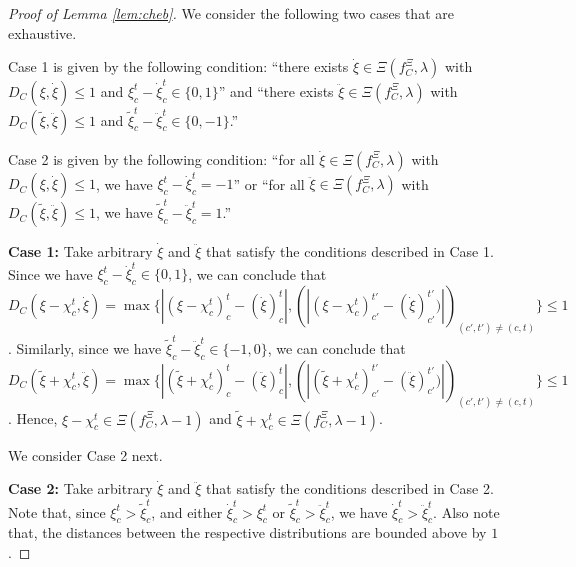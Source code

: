 \documentclass[12pt]{amsart}
\theoremstyle{remark}
\newcommand{\ieh}[1]{{\color{orange} IEH: #1 }}
\newcommand{\fk}[1]{{\color{red} FK: #1 }}
\begin{document}
\begin{proof}[Proof of Lemma \ref{lem:cheb}]
We consider the following two cases that are exhaustive.

Case 1 is given by the following condition: ``there exists $\dot{\xi} \in \Xi(f_C^{\Xi},\lambda)$ with $D_C(\xi,\dot{\xi}) \leq 1$ and $\xi_c^t - \dot{\xi}_c^t \in \{0,1\}$'' and ``there exists $\ddot{\xi} \in \Xi(f_C^{\Xi},\lambda)$ with $D_C(\tilde{\xi},\ddot{\xi}) \leq 1$ and $\tilde{\xi}_c^t - \ddot{\xi}_c^t \in \{0,-1\}$.''

Case 2 is given by the following condition: ``for all $\dot{\xi} \in \Xi(f_C^{\Xi},\lambda)$ with $D_C(\xi,\dot{\xi}) \leq 1$, we have $\xi_c^t - \dot{\xi}_c^t = -1$'' or ``for all $\ddot{\xi} \in \Xi(f_C^{\Xi},\lambda)$ with $D_C(\tilde{\xi},\ddot{\xi}) \leq 1$, we have $\tilde{\xi}_c^t - \ddot{\xi}_c^t = 1$.''


\medskip
\textbf{Case 1:} Take arbitrary $\dot{\xi}$ and $\ddot{\xi}$ that satisfy the conditions described in Case 1. Since we have $\xi_c^t - \dot{\xi}_c^t \in \{0, 1\}$, we can conclude that $D_C(\xi-\chi_c^t,\dot{\xi})=\max\{|(\xi-\chi_c^t)^t_c-(\dot{\xi})^t_c|, (|(\xi-\chi_c^t)^{t'}_{c'}-(\dot{\xi})^{t'}_{c'})|)_{(c',t') \neq (c,t)}\} \le 1$.
Similarly, since we have $\tilde{\xi}_c^t - \ddot{\xi}_c^t \in \{-1, 0\}$, we can conclude that $D_C(\tilde{\xi}+\chi_c^t,\ddot{\xi}) = \max\{|(\tilde{\xi}+\chi_c^t)^t_c-(\ddot{\xi})^t_c|, (|(\tilde{\xi}+\chi_c^t)^{t'}_{c'}-(\ddot{\xi})^{t'}_{c'})|)_{(c',t') \neq (c,t)}\} \le 1$. Hence, $\xi-\chi_c^t \in \Xi(f_C^{\Xi},\lambda-1)$ and $\tilde{\xi}+\chi_c^t \in \Xi(f_C^{\Xi},\lambda-1)$.

We consider Case 2 next.

\medskip
\textbf{Case 2:} Take arbitrary $\dot{\xi}$ and $\ddot{\xi}$ that satisfy the conditions described in Case 2. Note that, since $\xi_c^t>\tilde{\xi}_c^t$, and either $\dot{\xi}_c^t > \xi_c^t$ or  $\tilde{\xi}_c^t > \ddot{\xi}_c^t$, we have $\dot{\xi}_c^t>\ddot{\xi}_c^t$. Also note that, the distances between the respective distributions are bounded above by $1$.


\end{proof}
\end{document}
